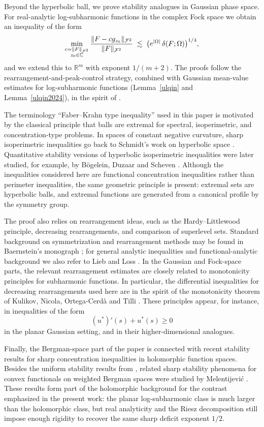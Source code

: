 \documentclass[a4paper,10pt]{amsart}
\newcommand{\Fock}{\mcalF^2}
\begin{document}
Beyond the hyperbolic ball, we prove stability analogues in Gaussian phase space.
For real-analytic log-subharmonic functions in the complex Fock space we obtain an inequality of
the form
\[
\min_{\substack{c=\|F\|_{\Fock}\\ z_0\in\mathbb C}}
\frac{\|F-cg_{z_0}\|_{\Fock}}{\|F\|_{\Fock}}
\;\lesssim\;
\bigl(e^{|\Omega|}\,\delta(F;\Omega)\bigr)^{1/4},
\]
and we extend this to $\mathbb R^m$ with exponent $1/(m+2)$.
The proofs follow the rearrangement-and-peak-control strategy, combined with Gaussian mean-value
estimates for log-subharmonic functions (Lemma~\ref{ulqin} and Lemma~\ref{ulqin2024}), in the spirit
of \cite{GomezGuerraRamosTilli2024}.
\begin{numrem}
The terminology ``Faber--Krahn type inequality'' used in this paper is
motivated by the classical principle that balls are extremal for spectral,
isoperimetric, and concentration-type problems. In spaces of constant
negative curvature, sharp isoperimetric inequalities go back to Schmidt's
work on hyperbolic space \cite{14}. Quantitative stability versions of
hyperbolic isoperimetric inequalities were later studied, for example, by
B\"ogelein, Duzaar and Scheven \cite{cvpde}. Although the inequalities
considered here are functional concentration inequalities rather than
perimeter inequalities, the same geometric principle is present: extremal
sets are hyperbolic balls, and extremal functions are generated from a
canonical profile by the symmetry group.

The proof also relies on rearrangement ideas, such as the
Hardy--Littlewood principle, decreasing rearrangements, and comparison of
superlevel sets. Standard background on symmetrization and rearrangement
methods may be found in Baernstein's monograph \cite{baernstein}; for
general analytic inequalities and functional-analytic background we also
refer to Lieb and Loss \cite{LiebLoss}. In the Gaussian and Fock-space
parts, the relevant rearrangement estimates are closely related to
monotonicity principles for subharmonic functions. In particular, the
differential inequalities for decreasing rearrangements used here are in
the spirit of the monotonicity theorem of Kulikov, Nicola,
Ortega-Cerd\`a and Tilli \cite{KulikovNicolaOrtegaCerdaTilli2025}. These
principles appear, for instance, in inequalities of the form
\[
        (u^*)'(s)+u^*(s)\ge 0
\]
in the planar Gaussian setting, and in their higher-dimensional analogues.

Finally, the Bergman-space part of the paper is connected with recent
stability results for sharp concentration inequalities in holomorphic
function spaces. Besides the uniform stability results from
\cite{GomezKalajMelentijevicRamos2025}, related sharp stability phenomena
for convex functionals on weighted Bergman spaces were studied by
Melentijevi\'c \cite{Melentijevic}. These results form part of the
holomorphic background for the contrast emphasized in the present work: the
planar log-subharmonic class is much larger than the holomorphic class, but
real analyticity and the Riesz decomposition still impose enough rigidity to
recover the same sharp deficit exponent \(1/2\).
\end{numrem}
\end{document}
